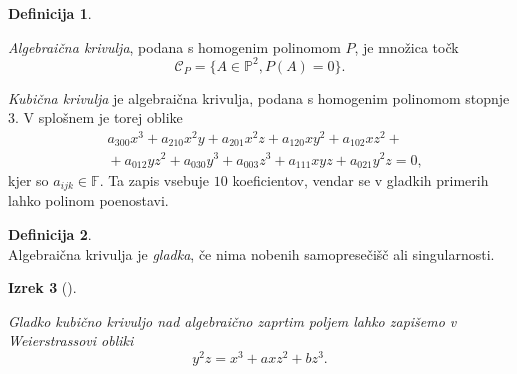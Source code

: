 \documentclass[12pt,a4paper,twoside]{article}
\theoremstyle{definition} %
\newtheorem{definicija}{Definicija}[section]
\theoremstyle{plain} %
\newtheorem{izrek}[definicija]{Izrek}
\numberwithin{equation}{section}  %
\newcommand{\F}{\mathbb F}
\begin{document}
\begin{definicija}~

\emph{Algebraična krivulja}, podana s homogenim polinomom $P$, je množica točk 
$$\mathcal{C}_P= \{ A \in \mathbb{P}^2, P(A) = 0 \}.$$
\end{definicija}

\emph{Kubična krivulja} je algebraična krivulja, podana s homogenim polinomom stopnje 3. V splošnem je torej oblike
\begin{align}
&{} a_{300}x^3+a_{210}x^2y+a_{201}x^2z+a_{120}xy^2+a_{102}xz^2+ \nonumber \\
&{}+a_{012}yz^2+a_{030}y^3+a_{003}z^3+a_{111}xyz+a_{021}y^2z = 0, \nonumber
\end{align}
kjer so $a_{ijk} \in \F$.
Ta zapis vsebuje $10$ koeficientov, vendar se v gladkih primerih lahko polinom poenostavi.
\begin{definicija}~\\
Algebraična krivulja je \emph{gladka}, če nima nobenih samopresečišč ali singularnosti.
\end{definicija}

\begin{izrek}[]~

Gladko kubično krivuljo nad algebraično zaprtim poljem lahko zapišemo v Weierstrassovi obliki
$$y^2z = x^3 + axz^2 + bz^3.$$
\end{izrek}
\end{document}
